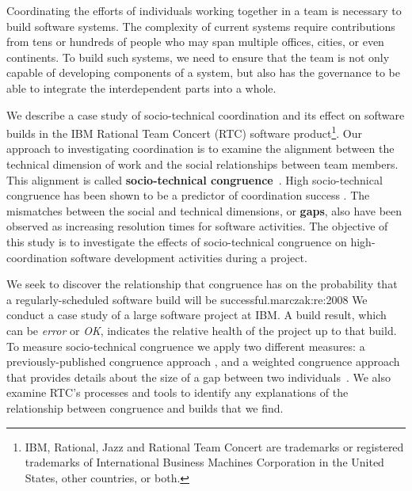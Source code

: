 



\label{chap:stc-net2}
Coordinating the efforts of individuals working together in a team is
necessary to build software systems. The complexity of current systems require contributions
from tens or hundreds of people who may span multiple offices, cities, or even continents.
To build such systems, we need to ensure that the team is not only capable of
developing components of a system, but also has the governance to be able to integrate the
interdependent parts into a whole.

We describe a case study of socio-technical coordination and its effect on software builds in the IBM\textsuperscript{\textregistered}
Rational Team Concert\textsuperscript{\textregistered} (RTC) software product\footnote{IBM, Rational, Jazz and Rational Team Concert are trademarks or registered trademarks of International Business Machines Corporation in the United States, other countries, or both.}.
Our approach to investigating coordination is to examine the
alignment between the technical dimension of work and the social relationships
between team members. This alignment is called \textbf{socio-technical
congruence}~\cite{cataldo:cscw:2006}. High socio-technical congruence
has been shown to be a predictor of coordination success
\cite{cataldo:cscw:2006,ehrlich2008:gaps}.
The mismatches between the social and technical dimensions, or \textbf{gaps},
also have been observed as increasing resolution times for software activities.
The objective of this study is to investigate the effects of socio-technical congruence on high-coordination software development activities during a project.

We seek to discover the relationship that congruence has on the probability that a regularly-scheduled software build will be successful.marczak:re:2008
We conduct a case study of a large software project at IBM.  A build result, which can be \emph{error} or \emph{OK}, indicates the relative health of the project up to that build. To
measure socio-technical congruence we apply two different measures: a
previously-published congruence approach \cite{cataldo:cscw:2006},
and a weighted congruence approach that provides details about the size of a
gap between two individuals~\cite{kwan2009:weighted}. We
also examine RTC's processes and tools to identify any
explanations of the relationship between congruence and builds that
we find.


